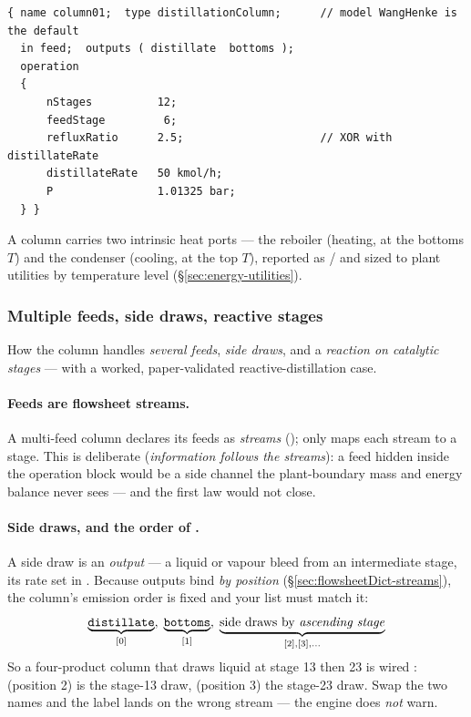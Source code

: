 \documentclass[11pt,a4paper]{article}
\begin{document}
\begin{lstlisting}[language=dict]
{ name column01;  type distillationColumn;      // model WangHenke is the default
  in feed;  outputs ( distillate  bottoms );
  operation
  {
      nStages          12;
      feedStage         6;
      refluxRatio      2.5;                     // XOR with distillateRate
      distillateRate   50 kmol/h;
      P                1.01325 bar;
  } }
\end{lstlisting}

A column carries two intrinsic heat ports --- the reboiler (heating, at
the bottoms $T$) and the condenser (cooling, at the top $T$), reported
as  /  and sized to plant
utilities by temperature level (\S\ref{sec:energy-utilities}).

\subsubsection{Multiple feeds, side draws, reactive stages}\label{sec:advanced-distillation}

\begin{whatyoulllearn}
How the  column handles \emph{several feeds},
\emph{side draws}, and a \emph{reaction on catalytic stages} --- with a
worked, paper-validated reactive-distillation case.
\end{whatyoulllearn}

\paragraph{Feeds are flowsheet streams.}  A multi-feed column declares
its feeds as \emph{streams} ();
 only maps each stream to a stage.  This is
deliberate (\emph{information follows the streams}): a feed hidden
inside the operation block would be a side channel the plant-boundary
mass and energy balance never sees --- and the first law would not
close.

\paragraph{Side draws, and the order of .}  A side draw
is an \emph{output} --- a liquid or vapour bleed from an intermediate
stage, its rate set in .  Because outputs
bind \emph{by position} (\S\ref{sec:flowsheetDict-streams}), the
column's emission order is fixed and your  list must
match it:
\[
   \underbrace{\texttt{distillate}}_{[0]},\;
   \underbrace{\texttt{bottoms}}_{[1]},\;
   \underbrace{\text{side draws by \emph{ascending stage}}}_{[2],[3],\dots}
\]
So a four-product column that draws liquid at stage 13 then 23 is wired
: 
(position 2) is the stage-13 draw,  (position 3) the
stage-23 draw.  Swap the two names and the label lands on the wrong
stream --- the engine does \emph{not} warn.
\end{document}

